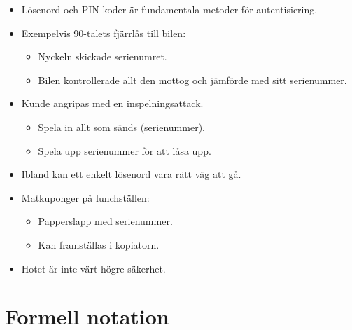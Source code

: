 \documentclass{beamer}
\theoremstyle{definition}
\theoremstyle{remark}
\begin{document}
\begin{frame}
  \begin{itemize}
    \item Lösenord och PIN-koder är fundamentala metoder för autentisiering.

      \pause{}

    \item Exempelvis 90-talets fjärrlås till bilen:
      \begin{itemize}
        \item Nyckeln skickade serienumret.
        \item Bilen kontrollerade allt den mottog och jämförde med sitt 
          serienummer.
      \end{itemize}

      \pause{}

    \item Kunde angripas med en inspelningsattack.
      \begin{itemize}
        \item Spela in allt som sänds (serienummer).
        \item Spela upp serienummer för att låsa upp.
      \end{itemize}

  \end{itemize}
\end{frame}

\begin{frame}
  \begin{itemize}
    \item Ibland kan ett enkelt lösenord vara rätt väg att gå.

    \item Matkuponger på lunchställen:
      \begin{itemize}
        \item Papperslapp med serienummer.
        \item Kan framställas i kopiatorn.
      \end{itemize}

      \pause{}

    \item Hotet är inte värt högre säkerhet.

  \end{itemize}
\end{frame}


\section{Formell notation}
\end{document}
